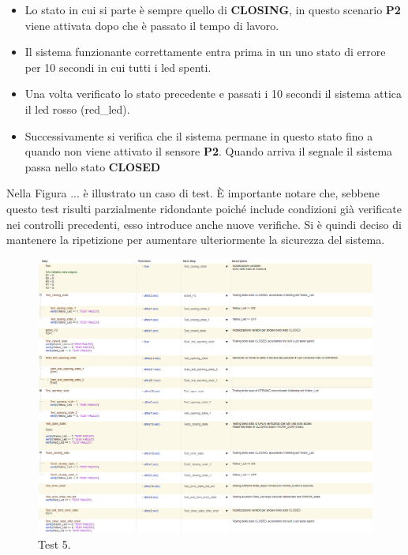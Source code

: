 \documentclass[12pt]{article}
\begin{document}
\begin{itemize}
    \item Lo stato in cui si parte è sempre quello di \textbf{CLOSING}, in questo scenario \textbf{P2} viene attivata dopo che è passato il tempo di lavoro.
    \item Il sistema funzionante correttamente entra prima in un uno stato di errore per 10 secondi in cui tutti i led spenti.
    \item Una volta verificato lo stato precedente e passati i 10 secondi il sistema attica il led rosso (red\_led). 
    \item Successivamente si verifica che il sistema permane in questo stato fino a quando non viene attivato il sensore \textbf{P2}. Quando arriva il segnale il sistema passa nello stato \textbf{CLOSED}
\end{itemize}

Nella Figura ... è illustrato un caso di test. È importante notare che, sebbene questo test risulti parzialmente ridondante poiché include condizioni già verificate nei controlli precedenti, esso introduce anche nuove verifiche. Si è quindi deciso di mantenere la ripetizione per aumentare ulteriormente la sicurezza del sistema.

\begin{figure}[H]
    
    \hspace{-2.3cm} %
    \includegraphics[width=1.3\textwidth]{Immagini_Test/Test_5_img.PNG}
    \caption{Test 5.}
    \label{fig:Test_5}
\end{figure}
\end{document}
